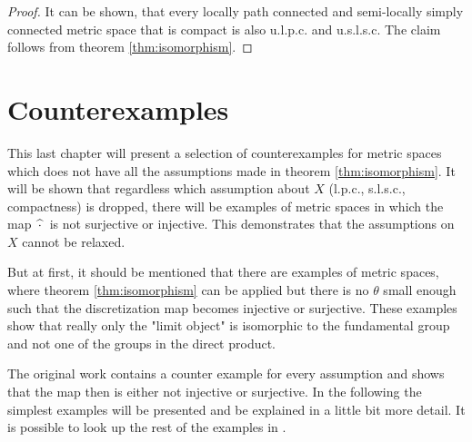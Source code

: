 \documentclass[a4paper, 11pt, twoside]{article}
\theoremstyle{break}
\theoremstyle{break}
\begin{document}
\begin{proof}
  It can be shown, that every locally path connected and semi-locally simply connected metric space that is compact is also u.l.p.c. and u.s.l.s.c. \cite[Lemma 5.14.4]{sakai2013geometric} The claim follows from theorem \ref{thm:isomorphism}.
\end{proof}

\section{Counterexamples}

This last chapter will present a selection of counterexamples for metric spaces which does not have all the assumptions made in theorem \ref{thm:isomorphism}.
It will be shown that regardless which assumption about $X$ (l.p.c., s.l.s.c., compactness) is dropped, 
there will be examples of metric spaces in which the map $\hspace*{2px}\widehat{\cdot}\hspace*{2px}$ is not surjective or injective.
This demonstrates that the assumptions on $X$ cannot be relaxed.

But at first, it should be mentioned that there are examples of metric spaces, where theorem \ref{thm:isomorphism} 
can be applied but there is no $\theta$ small enough such that the discretization map becomes injective or surjective.
These examples show that really only the "limit object" is isomorphic to the fundamental group and not one of the groups in the direct product.

The original work contains a counter example for every assumption and shows that the map then is either not injective or surjective. 
In the following the simplest examples will be presented and be explained in a little bit more detail. It is possible to look up the rest of the examples in \cite[p. 8ff]{vigolo2018fundamental}. 
\end{document}
